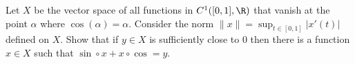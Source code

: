 Let $X$ be the vector space of all functions in $C^1([0,1],\R)$ that
vanish at the point $\alpha$ where $\cos(\alpha)=\alpha$. Consider the
norm $\|x\|=\sup_{t\in [0,1]}|x'(t)|$ defined on $X$. Show that if
$y\in X$ is sufficiently close to $0$ then there is a function $x\in
X$ such that $\sin\circ x+x\circ \cos=y$.
